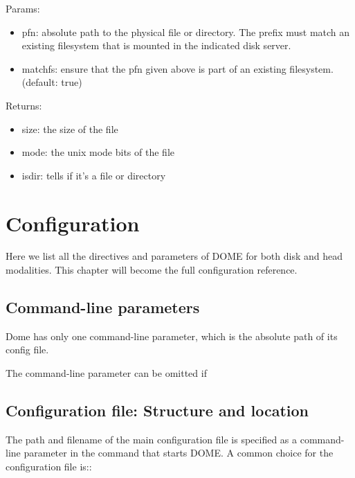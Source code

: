 \documentclass[a4paper,10pt]{scrreprt}
\begin{document}
Params:
\begin{itemize}
 \item pfn: absolute path to the physical file or directory. The prefix must match an existing filesystem that is mounted in the indicated disk server.
 \item matchfs: ensure that the pfn given above is part of an existing filesystem. (default: true)
\end{itemize}

Returns:
\begin{itemize}
 \item size: the size of the file
 \item mode: the unix mode bits of the file
 \item isdir: tells if it's a file or directory
\end{itemize}




















\chapter{Configuration}
Here we list all the directives and parameters of DOME for both disk and head modalities. This chapter will become the full configuration reference.\\

\section{Command-line parameters}

 Dome has only one command-line parameter, which is the absolute path of its config file.
 
 The command-line parameter can be omitted if 

\section{Configuration file: Structure and location}
The path and filename of the main configuration file is specified as a command-line parameter in the command that starts DOME. A common
choice for the configuration file is::\\
\end{document}
